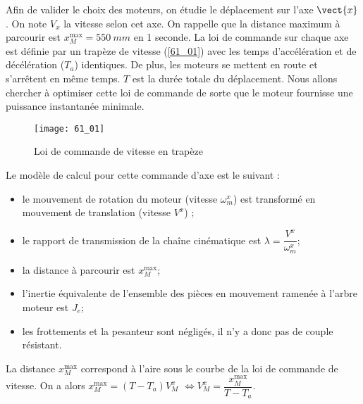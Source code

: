 \normaltrue
\correctionfalse


\setcounter{question}{0}%
\ifcorrection
\else
{}
\fi

\ifprof
\else
Afin de valider le choix des moteurs, on étudie le déplacement sur l’axe $\vect{x}$.%
On note $V_x$ la vitesse selon cet axe.
On rappelle que la distance maximum à parcourir est $x_M^{\text{max}} = \SI{550}{mm}$ en 1 seconde.
La loi de commande sur chaque axe est définie par un trapèze de vitesse (\autoref{61_01})
avec les temps d’accélération et de décélération ($T_a$) identiques. De plus, les moteurs se mettent en route et s’arrêtent en
même temps. $T$ est la durée totale du déplacement. Nous allons chercher à optimiser cette loi de commande de sorte
que le moteur fournisse une puissance instantanée minimale.

\begin{figure}[H]
\centering
\texttt{[image: 61\_01]}
\caption{\label{61_01} Loi de commande de vitesse en trapèze}
\end{figure}

Le modèle de calcul pour cette commande d’axe est le suivant :
\begin{itemize}
\item le mouvement de rotation du moteur (vitesse $\omega_m^x$) est transformé en mouvement de translation (vitesse $V^x$) ;
\item le rapport de transmission de la chaîne cinématique est $\lambda = \dfrac{V^x}{\omega_m^x}$;
\item la distance à parcourir est $x_M^{\text{max}}$;
\item l’inertie équivalente de l’ensemble des pièces en mouvement ramenée à l’arbre moteur est $J_e$;
\item les frottements et la pesanteur sont négligés, il n’y a donc pas de couple résistant.
\end{itemize}
\fi
{}
\ifprof
La distance  $x_M^{\text{max}}$ correspond à l'aire sous le courbe de la loi de commande de vitesse.
On a alors 
 $x_M^{\text{max}} = \left(T-T_a\right)V_M^x$ 
 $ \Longleftrightarrow V_M^x=\dfrac{x_M^{\text{max}}}{T-T_a}$. 
\else
\fi

